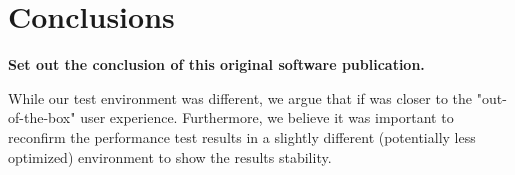 \section{Conclusions}
\label{} 

\textbf{Set out the conclusion of this original software publication.}

While our test environment was different, we argue that if was closer to the "out-of-the-box" user experience. Furthermore, we believe it was important to reconfirm the performance test results in a slightly different (potentially less optimized) environment to show the results stability.

  
  